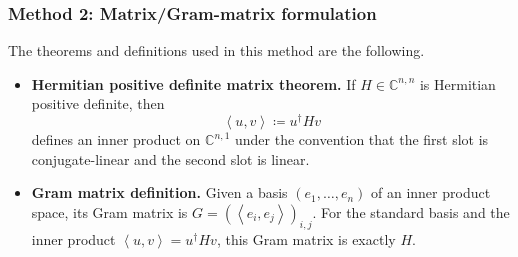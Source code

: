 \documentclass[12pt]{article}
\newcommand{\df}{\coloneqq}
\newcommand{\C}{\mathbb{C}}
\newcommand{\ip}[2]{\left\langle #1,#2\right\rangle}
\begin{document}
\newpage
\subsubsection{Method 2: Matrix/Gram-matrix formulation}
The theorems and definitions used in this method are the following.
\begin{itemize}[leftmargin=*]
  \item \textbf{Hermitian positive definite matrix theorem.} If $H\in\C^{n,n}$ is Hermitian positive definite, then
  \[
  \ip{u}{v}\df u^\dagger Hv
  \]
  defines an inner product on $\C^{n,1}$ under the convention that the first slot is conjugate-linear and the second slot is linear.
  \item \textbf{Gram matrix definition.} Given a basis $(e_1,\dots,e_n)$ of an inner product space, its Gram matrix is
  $G=(\ip{e_i}{e_j})_{i,j}$. For the standard basis and the inner product $\ip{u}{v}=u^\dagger Hv$, this Gram matrix is exactly $H$.
\end{itemize}
\end{document}
